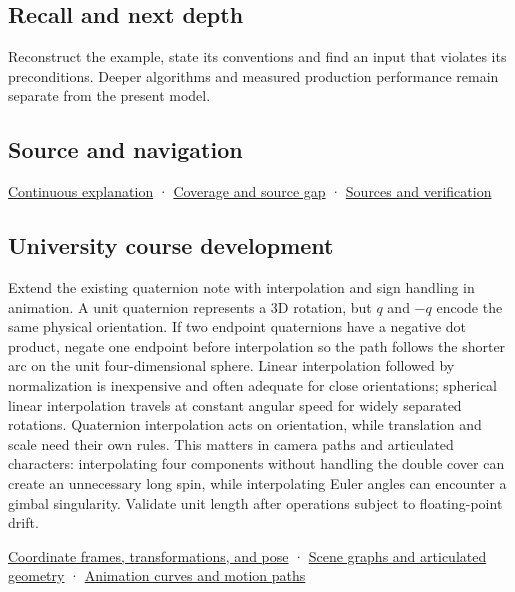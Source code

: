 \subsection{Recall and next depth}\label{recall-and-next-depth}

Reconstruct the example, state its conventions and find an input that violates its preconditions. Deeper algorithms and measured production performance remain separate from the present model.

\subsection{Source and navigation}\label{source-and-navigation}

\href{Continuous\%20Notes/Computing\%20Foundations\%20-\%20From\%20Bits\%20to\%20C++\%20and\%20Systems\%20APIs\#Keep\%20the\%20promises\%20visible\%20while\%20moving\%20between\%20representations}{Continuous explanation} · \hyperref[appendix-fd090d982a15]{Coverage and source gap} · \hyperref[appendix-a103e7846d21]{Sources and verification}

\subsection{University course development}\label{university-course-development}

Extend the existing quaternion note with interpolation and sign handling in animation. A unit quaternion represents a 3D rotation, but \(q\) and \(-q\) encode the same physical orientation. If two endpoint quaternions have a negative dot product, negate one endpoint before interpolation so the path follows the shorter arc on the unit four-dimensional sphere. Linear interpolation followed by normalization is inexpensive and often adequate for close orientations; spherical linear interpolation travels at constant angular speed for widely separated rotations. Quaternion interpolation acts on orientation, while translation and scale need their own rules. This matters in camera paths and articulated characters: interpolating four components without handling the double cover can create an unnecessary long spin, while interpolating Euler angles can encounter a gimbal singularity. Validate unit length after operations subject to floating-point drift.

\href{Continuous\%20Notes/University\%20-\%20Worlds,\%20Images\%20and\%20Inference\%20-\%20Graphics,\%20Vision\%20and\%20Photography\#Coordinate\%20frames,\%20transformations,\%20and\%20pose}{Coordinate frames, transformations, and pose} · \href{Continuous\%20Notes/University\%20-\%20Worlds,\%20Images\%20and\%20Inference\%20-\%20Graphics,\%20Vision\%20and\%20Photography\#Scene\%20graphs\%20and\%20articulated\%20geometry}{Scene graphs and articulated geometry} · \href{Continuous\%20Notes/University\%20-\%20Worlds,\%20Images\%20and\%20Inference\%20-\%20Graphics,\%20Vision\%20and\%20Photography\#Animation\%20curves\%20and\%20motion\%20paths}{Animation curves and motion paths}
